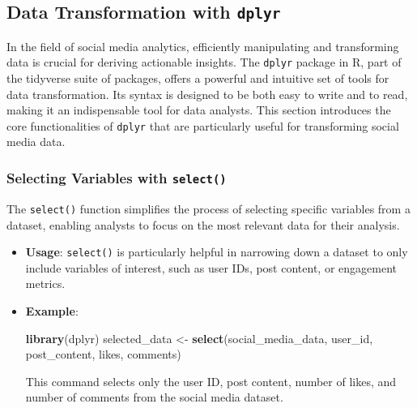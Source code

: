 \documentclass[
]{book}
\newenvironment{Shaded}{\begin{snugshade}}{\end{snugshade}}
\newcommand{\FunctionTok}[1]{\textcolor[rgb]{0.13,0.29,0.53}{\textbf{#1}}}
\newcommand{\NormalTok}[1]{#1}
\newcommand{\OtherTok}[1]{\textcolor[rgb]{0.56,0.35,0.01}{#1}}
\begin{document}
\hypertarget{data-transformation-with-dplyr}{%
\subsection{\texorpdfstring{Data Transformation with \texttt{dplyr}}{Data Transformation with dplyr}}\label{data-transformation-with-dplyr}}

In the field of social media analytics, efficiently manipulating and transforming data is crucial for deriving actionable insights. The \texttt{dplyr} package in R, part of the tidyverse suite of packages, offers a powerful and intuitive set of tools for data transformation. Its syntax is designed to be both easy to write and to read, making it an indispensable tool for data analysts. This section introduces the core functionalities of \texttt{dplyr} that are particularly useful for transforming social media data.

\hypertarget{selecting-variables-with-select}{%
\subsubsection{\texorpdfstring{Selecting Variables with \texttt{select()}}{Selecting Variables with select()}}\label{selecting-variables-with-select}}

The \texttt{select()} function simplifies the process of selecting specific variables from a dataset, enabling analysts to focus on the most relevant data for their analysis.

\begin{itemize}
\item
  \textbf{Usage}: \texttt{select()} is particularly helpful in narrowing down a dataset to only include variables of interest, such as user IDs, post content, or engagement metrics.
\item
  \textbf{Example}:

\begin{Shaded}
\begin{Highlighting}[]
\FunctionTok{library}\NormalTok{(dplyr)}
\NormalTok{selected\_data }\OtherTok{\textless{}{-}} \FunctionTok{select}\NormalTok{(social\_media\_data, user\_id, post\_content, likes, comments)}
\end{Highlighting}
\end{Shaded}

  This command selects only the user ID, post content, number of likes, and number of comments from the social media dataset.
\end{itemize}
\end{document}
